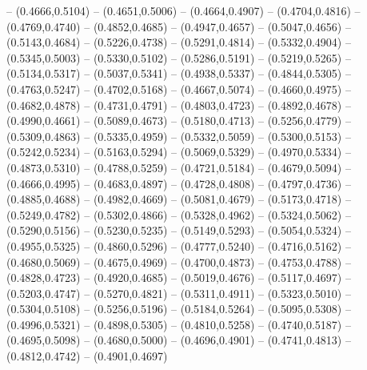 {	-- (0.4666,0.5104)
	-- (0.4651,0.5006)
	-- (0.4664,0.4907)
	-- (0.4704,0.4816)
	-- (0.4769,0.4740)
	-- (0.4852,0.4685)
	-- (0.4947,0.4657)
	-- (0.5047,0.4656)
	-- (0.5143,0.4684)
	-- (0.5226,0.4738)
	-- (0.5291,0.4814)
	-- (0.5332,0.4904)
	-- (0.5345,0.5003)
	-- (0.5330,0.5102)
	-- (0.5286,0.5191)
	-- (0.5219,0.5265)
	-- (0.5134,0.5317)
	-- (0.5037,0.5341)
	-- (0.4938,0.5337)
	-- (0.4844,0.5305)
	-- (0.4763,0.5247)
	-- (0.4702,0.5168)
	-- (0.4667,0.5074)
	-- (0.4660,0.4975)
	-- (0.4682,0.4878)
	-- (0.4731,0.4791)
	-- (0.4803,0.4723)
	-- (0.4892,0.4678)
	-- (0.4990,0.4661)
	-- (0.5089,0.4673)
	-- (0.5180,0.4713)
	-- (0.5256,0.4779)
	-- (0.5309,0.4863)
	-- (0.5335,0.4959)
	-- (0.5332,0.5059)
	-- (0.5300,0.5153)
	-- (0.5242,0.5234)
	-- (0.5163,0.5294)
	-- (0.5069,0.5329)
	-- (0.4970,0.5334)
	-- (0.4873,0.5310)
	-- (0.4788,0.5259)
	-- (0.4721,0.5184)
	-- (0.4679,0.5094)
	-- (0.4666,0.4995)
	-- (0.4683,0.4897)
	-- (0.4728,0.4808)
	-- (0.4797,0.4736)
	-- (0.4885,0.4688)
	-- (0.4982,0.4669)
	-- (0.5081,0.4679)
	-- (0.5173,0.4718)
	-- (0.5249,0.4782)
	-- (0.5302,0.4866)
	-- (0.5328,0.4962)
	-- (0.5324,0.5062)
	-- (0.5290,0.5156)
	-- (0.5230,0.5235)
	-- (0.5149,0.5293)
	-- (0.5054,0.5324)
	-- (0.4955,0.5325)
	-- (0.4860,0.5296)
	-- (0.4777,0.5240)
	-- (0.4716,0.5162)
	-- (0.4680,0.5069)
	-- (0.4675,0.4969)
	-- (0.4700,0.4873)
	-- (0.4753,0.4788)
	-- (0.4828,0.4723)
	-- (0.4920,0.4685)
	-- (0.5019,0.4676)
	-- (0.5117,0.4697)
	-- (0.5203,0.4747)
	-- (0.5270,0.4821)
	-- (0.5311,0.4911)
	-- (0.5323,0.5010)
	-- (0.5304,0.5108)
	-- (0.5256,0.5196)
	-- (0.5184,0.5264)
	-- (0.5095,0.5308)
	-- (0.4996,0.5321)
	-- (0.4898,0.5305)
	-- (0.4810,0.5258)
	-- (0.4740,0.5187)
	-- (0.4695,0.5098)
	-- (0.4680,0.5000)
	-- (0.4696,0.4901)
	-- (0.4741,0.4813)
	-- (0.4812,0.4742)
	-- (0.4901,0.4697)
}

